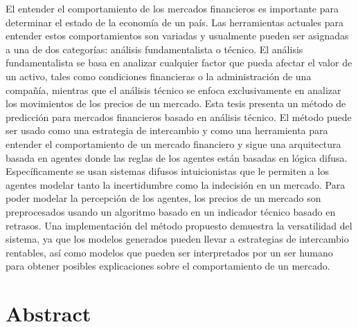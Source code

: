 % 
% 
%

El entender el comportamiento de los mercados financieros es importante para determinar el estado de la economía de un país. Las herramientas actuales para entender estos comportamientos son variadas y usualmente pueden ser asignadas a una de dos categorías: análisis fundamentalista o técnico. El análisis fundamentalista se basa en analizar cualquier factor que pueda afectar el valor de un activo, tales como condiciones financieras o la administración de una compañía, mientras que el análisis técnico se enfoca exclusivamente en analizar los movimientos de los precios de un mercado. Esta tesis presenta un método de predicción para mercados financieros basado en análisis técnico. El método puede ser usado como una estrategia de intercambio y como una herramienta para entender el comportamiento de un mercado financiero y sigue una arquitectura basada en agentes donde las reglas de los agentes están basadas en lógica difusa. Específicamente se usan sistemas difusos intuicionistas que le permiten a los agentes modelar tanto la incertidumbre como la indecisión en un mercado. Para poder modelar la percepción de los agentes, los precios de un mercado son preprocesados usando un algoritmo basado en un indicador técnico basado en retrasos. Una implementación del método propuesto demuestra la versatilidad del sistema, ya que los modelos generados pueden llevar a estrategias de intercambio rentables, así como modelos que pueden ser interpretados por un ser humano para obtener posibles explicaciones sobre el comportamiento de un mercado.

\clearpage
\section*{Abstract}

